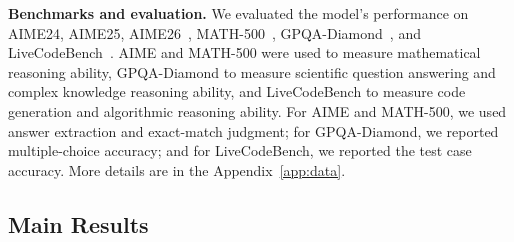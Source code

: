 \documentclass{article}
\theoremstyle{plain}
\theoremstyle{definition}
\theoremstyle{remark}
\begin{document}

\textbf{Benchmarks and evaluation.} We evaluated the model's performance on AIME24, AIME25, AIME26~\cite{aime26}, MATH-500~\cite{hendrycksmath2021}, GPQA-Diamond~\cite{rein2023gpqagraduatelevelgoogleproofqa}, and LiveCodeBench~\cite{jain2024livecodebench}. AIME and MATH-500 were used to measure mathematical reasoning ability, GPQA-Diamond to measure scientific question answering and complex knowledge reasoning ability, and LiveCodeBench to measure code generation and algorithmic reasoning ability. For AIME and MATH-500, we used answer extraction and exact-match judgment; for GPQA-Diamond, we reported multiple-choice accuracy; and for LiveCodeBench, we reported the test case accuracy. More details are in the Appendix~\ref{app:data}.




\subsection{Main Results}
\label{sec:main_results}
\end{document}
